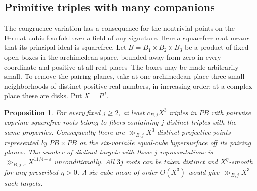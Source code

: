 \documentclass[11pt,letterpaper]{article}
\newtheorem{proposition}[proposition]{Proposition}
\theoremstyle{definition}
\numberwithin{equation}{section}
\begin{document}
\subsection{Primitive triples with many companions}
The congruence variation has a consequence for the nontrivial
points on the Fermat cubic fourfold over a field of any signature.
Here a squarefree root means that its principal ideal is squarefree.
Let $B=B_1\times B_2\times B_3$ be a product of fixed open boxes
in the archimedean space, bounded away from zero in every
coordinate and positive at all real places. The boxes may be made
arbitrarily small. To remove the pairing planes, take at one
archimedean place three small neighborhoods of distinct positive
real numbers, in increasing order; at a complex place these are
disks. Put $X=P^d$.
\begin{proposition}\label{nf3:manyprimitive}
For every fixed $j\ge2$, at least $c_{B,j}X^3$ triples in $PB$
with pairwise coprime squarefree roots belong to fibers containing
$j$ distinct triples with the same properties. Consequently there
are $\gg_{B,j}X^3$ distinct projective points represented by
$PB\times PB$ on the six-variable equal-cube hypersurface off
its pairing planes. The number of distinct targets with these
$j$ representations is $\gg_{B,j,\varepsilon}X^{11/4-\varepsilon}$
unconditionally. All $3j$ roots can be taken distinct and
$X^\eta$-smooth for any prescribed $\eta>0$.
A six-cube mean of order $O(X^3)$ would give
$\gg_{B,j} X^3$ such targets.
\end{proposition}
\end{document}
